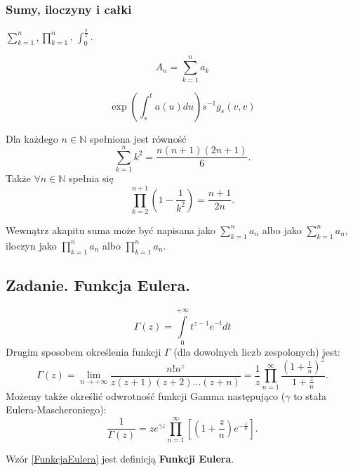 \documentclass[a4paper, 12pt]{amsart}
\begin{document}
\subsubsection{Sumy, iloczyny i całki}
$\sum\limits^{n}_{k=1}, \prod_{k=1}^{n}$, $\int_{0}^{\frac{\pi}{2}}$.

$$
A_n=\sum_{k=1}^n a_k
$$

$$
\exp(\int_s^t a(u)du)s^{-1}g_s(v,v)
$$

Dla każdego $n\in\mathbb N$ spełniona jest równość 
    \begin{equation*}
      \sum_{k=1}^{n}k^2 = \frac{n(n+1)(2n+1)}{6}.
 \end{equation*}
Także $\forall n\in\mathbb N$ spełnia się
    \begin{equation*}
      \prod_{k=2}^{n+1}\left(1-\frac{1}{k^2}\right) = \frac{n+1}{2n}.
 \end{equation*}

Wewnątrz akapitu suma może być napisana jako $\sum_{k=1}^{n}a_n$ albo jako $\sum\limits_{k=1}^{n}a_n$, iloczyn jako $\prod_{k=1}^{n}a_n$ albo $\prod\limits_{k=1}^{n}a_n$.


\subsection{Zadanie. Funkcja Eulera.} 
    \begin{equation}\label{FunkcjaEulera}
\Gamma(z) = \int\limits_0^{+\infty} t^{z-1}e^{-t}dt
 \end{equation}
Drugim sposobem określenia funkcji $\Gamma$ (dla dowolnych liczb zespolonych) jest:
    \begin{equation}
\Gamma(z) = \lim_{n\rightarrow +\infty} \frac{n!n^z}{z(z+1)(z+2) \ldots (z+n)} = \frac{1}{z} \prod_{n=1}^\infty \frac{\left(1+\frac{1}{n}\right)^z}{1+\frac{z}{n}}.
 \end{equation}
Możemy także określić odwrotność funkcji Gamma następująco ($\gamma$ to stała Eulera-Mascheroniego):
    \begin{equation}
\frac{1}{\Gamma (z)}=ze^{\gamma z}\prod_{n=1}^\infty \left[\left(1+\frac{z}{n}\right)e^{-\frac{z}{n}}\right].
 \end{equation}

Wzór \eqref{FunkcjaEulera} jest definicj\k{a} \textbf{Funkcji Eulera}.
\end{document}
